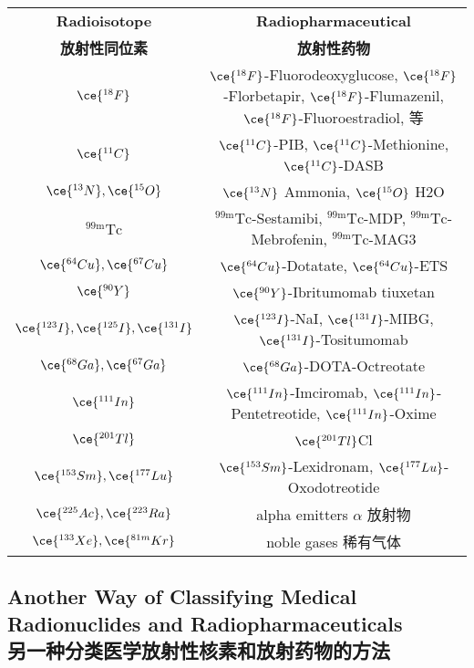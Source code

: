 \documentclass[dvipsnames, svgnames,a4paper,11pt]{article}
\begin{document}
\begin{table}[h]
      \centering
       \label{tabel2}
      \begin{tabular}{cc}
      \toprule
      \textbf{Radioisotope} & \textbf{Radiopharmaceutical} \\
      \textbf{放射性同位素} & \textbf{放射性药物} \\
      \midrule
      \(\ce{^{18}F}\) & \(\ce{^{18}F}\)-Fluorodeoxyglucose, \(\ce{^{18}F}\)-Florbetapir, \(\ce{^{18}F}\)-Flumazenil, \(\ce{^{18}F}\)-Fluoroestradiol, 等 \\
      \(\ce{^{11}C}\) & \(\ce{^{11}C}\)-PIB, \(\ce{^{11}C}\)-Methionine, \(\ce{^{11}C}\)-DASB \\
      \(\ce{^{13}N}, \ce{^{15}O}\) & \(\ce{^{13}N}\) Ammonia, \(\ce{^{15}O}\) H2O \\
      \(\mathrm{^{99m}Tc}\) & \(\mathrm{^{99m}Tc}\)-Sestamibi, \(\mathrm{^{99m}Tc}\)-MDP, \(\mathrm{^{99m}Tc}\)-Mebrofenin, \(\mathrm{^{99m}Tc}\)-MAG3 \\
      \(\ce{^{64}Cu}, \ce{^{67}Cu}\) & \(\ce{^{64}Cu}\)-Dotatate, \(\ce{^{64}Cu}\)-ETS \\
      \(\ce{^{90}Y}\) & \(\ce{^{90}Y}\)-Ibritumomab tiuxetan \\
      \(\ce{^{123}I}, \ce{^{125}I}, \ce{^{131}I}\) & \(\ce{^{123}I}\)-NaI, \(\ce{^{131}I}\)-MIBG, \(\ce{^{131}I}\)-Tositumomab \\
      \(\ce{^{68}Ga}, \ce{^{67}Ga}\) & \(\ce{^{68}Ga}\)-DOTA-Octreotate \\
      \(\ce{^{111}In}\) & \(\ce{^{111}In}\)-Imciromab, \(\ce{^{111}In}\)-Pentetreotide, \(\ce{^{111}In}\)-Oxime \\
      \(\ce{^{201}Tl}\) & \(\ce{^{201}Tl}\)Cl \\
      \(\ce{^{153}Sm}, \ce{^{177}Lu}\) & \(\ce{^{153}Sm}\)-Lexidronam, \(\ce{^{177}Lu}\)-Oxodotreotide \\
      \(\ce{^{225}Ac}, \ce{^{223}Ra}\) & alpha emitters $\alpha$ 放射物 \\
      \(\ce{^{133}Xe}, \ce{^{81m}Kr}\) & noble gases 稀有气体  \\
      \bottomrule
      \end{tabular}
      \end{table}

\subsection{Another Way of Classifying Medical Radionuclides and Radiopharmaceuticals\\另一种分类医学放射性核素和放射药物的方法}
\end{document}

